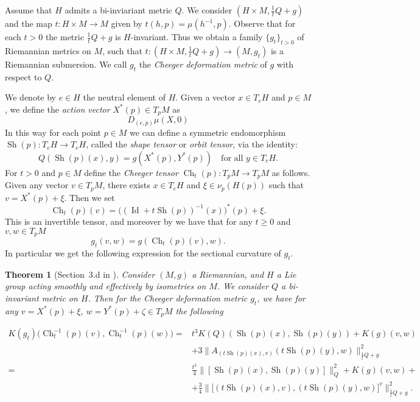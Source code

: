 \documentclass[12pt,a4paper,reqno]{amsart}
\DeclareMathOperator{\Ch}{Ch}
\DeclareMathOperator{\Id}{Id}
\DeclareMathOperator{\Sh}{Sh} %
\newcommand{\1}{\mathbbm{1}} %
\newtheorem{thm}{Theorem}[section]
\theoremstyle{definition}
\theoremstyle{TheoremNum}
\begin{document}
Assume that $H$ admits a bi-inviariant metric $Q$. We consider $(H\times M, \frac{1}{t} Q+g)$ and the map $t\colon H\times M\to M$ given by $t(h,p) = \mu(h^{-1},p)$. Observe that for each $t>0$ the metric  $\frac{1}{t}Q+g$ is $H$-invariant. Thus we obtain a family $\{g_t\}_{t>0}$ of Riemannian metrics on $M$, such that $t\colon (H\times M,\frac{1}{t}Q+g)\to (M,g_t)$ is a Riemannian submersion. We call $g_t$ the \emph{Cheeger deformation metric} of $g$ with respect to $Q$.

We denote by $e\in H$ the neutral element of $H$. Given a vector $x\in T_eH$ and $p\in M$, we define the \emph{action vector} $X^\ast(p)\in T_p M$ as
\[
D_{(e,p)}\mu(X,0)
\] 
In this way for each point $p\in M$ we can define a symmetric endomorphism $\Sh(p)\colon T_e H\to T_e H$, called the \emph{shape tensor} or \emph{orbit tensor}, via the identity:
\[
	Q(\Sh(p)(x),y) = g(X^\ast(p),Y^\ast(p))\quad \mbox{for all } y\in T_eH.
\]
For $t>0$ and $p\in M$ define the \emph{Cheeger tensor} $\Ch_t(p)\colon T_pM\to T_pM$ as follows. Given any vector $v\in T_p M$, there exists $x\in T_e H$ and $\xi\in \nu_p(H(p))$ such that $v= X^\ast(p)+\xi$. Then we set
\[
\Ch_t(p)(v) =\Big((\Id+t\Sh(p))^{-1}(x)\Big)^\ast(p)+\xi.
\]
This is an invertible tensor, and moreover by \cite[Satz 3.3]{Mueter} we have that for any $t\geq 0$ and $v,w\in T_p M$
\[
g_t(v,w) = g(\Ch_t(p)(v),w).
\]
In particular we get the following expression for the sectional curvature of $g_t$.

\begin{thm}[Section~3.d in \cite{Mueter}]\th\label{T: Classical cheeger deformation classical}
Consider $(M,g)$ a Riemannian, and $H$ a Lie group acting smoothly and effectively by isometries on $M$. We consider $Q$ a bi-invariant metric on $H$. Then for the Cheeger deformation metric $g_t$, we have for any $v=X^\ast(p)+\xi$, $w=Y^\ast(p)+\zeta\in T_pM$ the following
\begin{linenomath}
\begin{align*}
K(g_t)\Big(\Ch_t^{-1}(p)(v),\Ch^{-1}_t(p)(w)\Big) =& t^3 K(Q)(\Sh(p)(x),\Sh(p)(y))+ K(g)(v,w)\\
&+3\|A_{(t\Sh(p)(x),v)}(t\Sh(p)(y),w)\|^2_{\frac{1}{t}Q+g}\\
=& \frac{t^3}{4}\Big\|[\Sh(p)(x),\Sh(p)(y)]\Big\|^2_Q+K(g)(v,w)+\\ 
&+\frac{3}{4}\Big\|\big[(t\Sh(p)(x),v),(t\Sh(p)(y),w)\big]^v\Big\|^2_{\frac{1}{t}Q+g}.
\end{align*}
\end{linenomath}
\end{thm}
\end{document}
